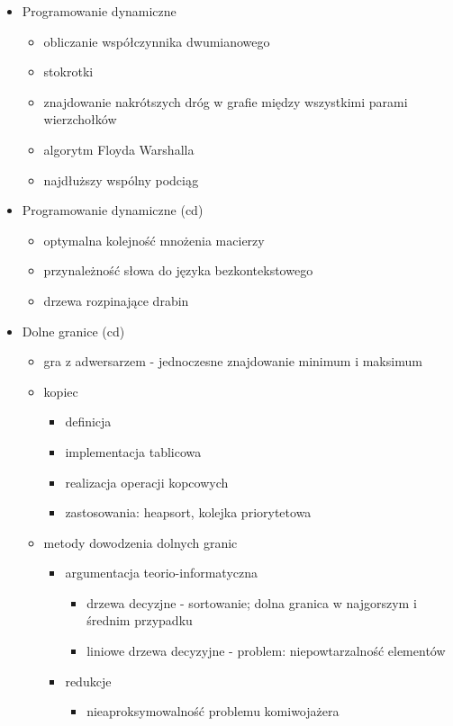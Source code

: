 \documentclass[svgnames]{report}
\begin{document}
\begin{itemize}
\item Programowanie dynamiczne
\begin{itemize}
	\item obliczanie współczynnika dwumianowego
	\item stokrotki
	\item znajdowanie nakrótszych dróg w grafie między wszystkimi parami wierzchołków
	\item algorytm Floyda Warshalla
	\item najdłuższy wspólny podciąg
\end{itemize}

\item Programowanie dynamiczne (cd)
\begin{itemize}
	\item optymalna kolejność mnożenia macierzy
	\item przynależność słowa do języka bezkontekstowego
	\item drzewa rozpinające drabin
\end{itemize}

\item Dolne granice (cd)
\begin{itemize}
	\item gra z adwersarzem - jednoczesne znajdowanie minimum i maksimum
	\item kopiec
	\begin{itemize}
		\item definicja
		\item implementacja tablicowa
		\item realizacja operacji kopcowych
		\item zastosowania: heapsort, kolejka priorytetowa
	\end{itemize}
	
	\item metody dowodzenia dolnych granic
	\begin{itemize}
		\item argumentacja teorio-informatyczna
		\begin{itemize}
			\item drzewa decyzjne - sortowanie; dolna granica w najgorszym i średnim przypadku
			\item liniowe drzewa decyzyjne - problem: niepowtarzalność elementów
		\end{itemize}
		\item redukcje 
		\begin{itemize}
			\item nieaproksymowalność problemu komiwojażera
		\end{itemize}
	\end{itemize}
\end{itemize}



\end{itemize}
\end{document}
